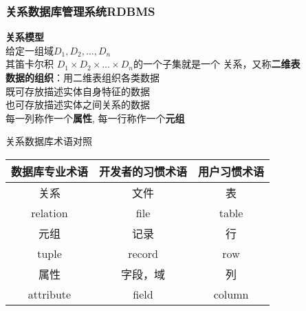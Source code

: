 \documentclass[compress]{beamer}
\begin{document}
\begin{frame}
  \frametitle{关系数据库管理系统RDBMS}
   {
  \textbf{关系模型}\\
  给定一组域$D_1, D_2, \ldots, D_n$ \\
  其笛卡尔积 $D_1 \times D_2 \times \ldots \times D_n$的一个子集就是一个
  关系，又称\textbf{二维表}  \\[2ex]

  \textbf{数据的组织}：用二维表组织各类数据 \\
  \quad 既可存放描述实体自身特征的数据 \\
  \quad 也可存放描述实体之间关系的数据 \\

  \quad 每一列称作一个\textbf{属性}, 每一行称作一个\textbf{元组}
  }

   {
    关系数据库术语对照\\[2ex]

    \begin{tabular}{|c|c|c|}
      \hline
      {\bfseries 数据库专业术语} & {\bfseries 开发者的习惯术语}  &
      {\bfseries 用户习惯术语} \\ \hline
      \hline
      关系 & 文件 & 表 \\ 
      relation  & file &  table  \\ \hline
      元组 & 记录 & 行 \\ 
      tuple & record   & row \\ \hline
      属性 & 字段，域 & 列 \\ 
      attribute & field &  column \\ \hline
    \end{tabular}

  }

\end{frame}
\end{document}
